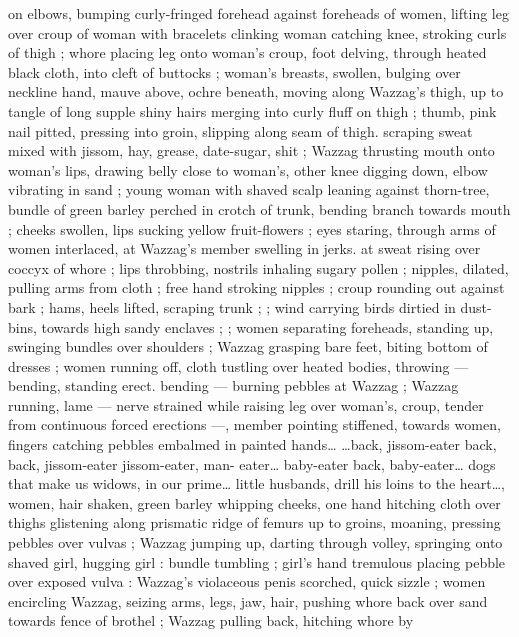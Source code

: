 on elbows, bumping curly-fringed forehead against foreheads of 
women, lifting leg over croup of woman with bracelets clinking 
woman catching knee, stroking curls of thigh ; whore placing leg 
onto woman's croup, foot delving, through heated black cloth, into 
cleft of buttocks ; woman's breasts, swollen, bulging over neckline 
hand, mauve above, ochre beneath, moving along Wazzag's thigh, up 
to tangle of long supple shiny hairs merging into curly fluff on thigh 
; thumb, pink nail pitted, pressing into groin, slipping along seam of 
thigh. scraping sweat mixed with jissom, hay, grease, date-sugar, shit 
; Wazzag thrusting mouth onto woman's lips, drawing belly close to 
woman's, other knee digging down, elbow vibrating in sand ; young 
woman with shaved scalp leaning against thorn-tree, bundle of green 
barley perched in crotch of trunk, bending branch towards mouth ; 
cheeks swollen, lips sucking yellow fruit-flowers ; eyes staring, 
through arms of women interlaced, at Wazzag's member swelling in 
jerks. at sweat rising over coccyx of whore ; lips throbbing, nostrils 
inhaling sugary pollen ; nipples, dilated, pulling arms from cloth ; 
free hand stroking nipples ; croup rounding out against bark ; hams, 
heels lifted, scraping trunk ; ; wind carrying birds dirtied in dust- 
bins, towards high sandy enclaves ; ; women separating foreheads, 
standing up, swinging bundles over shoulders ; Wazzag grasping 
bare feet, biting bottom of dresses ; women running off, cloth 
tustling over heated bodies, throwing --- bending, standing erect. 
bending --- burning pebbles at Wazzag ; Wazzag running, lame --- 
nerve strained while raising leg over woman's, croup, tender from 
continuous forced erections ---, member pointing stiffened, towards 
women, fingers catching pebbles embalmed in painted hands{\ldots} 
{\gl}{\ldots}back, jissom-eater{\td} back, back, jissom-eater{\td} jissom-eater, man- 
eater{\ldots} baby-eater{\td} back, baby-eater{\ldots} dogs that make us widows, in 
our prime{\ldots} little husbands, drill his loins to the heart{\ldots}{\gr}, women, 
hair shaken, green barley whipping cheeks, one hand hitching cloth 
over thighs glistening along prismatic ridge of femurs up to groins, 
moaning, pressing pebbles over vulvas ; Wazzag jumping up, darting 
through volley, springing onto shaved girl, hugging girl : bundle 
tumbling ; girl's hand tremulous placing pebble over exposed vulva : 
Wazzag's violaceous penis scorched, quick sizzle ; women encircling 
Wazzag, seizing arms, legs, jaw, hair, pushing whore back over sand 
towards fence of brothel ; Wazzag pulling back, hitching whore by 
